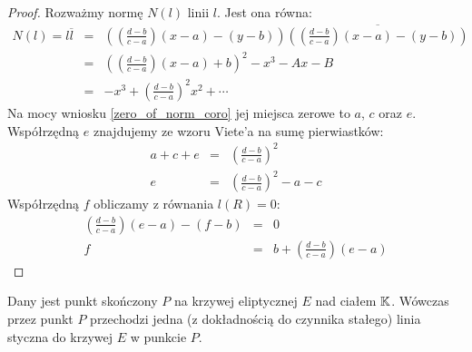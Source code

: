 \begin{proof}
Rozważmy normę $N(l)$ linii $l$. Jest ona równa:
\begin{eqnarray*}
N(l) = l\overline{l}
& = & \left(\left(\frac{d-b}{c-a}\right)(x - a) - (y - b)\right)
      \overline{\left(\left(\frac{d-b}{c-a}\right)(x - a) - (y - b)\right)} \\
& = & \left(\left(\frac{d-b}{c-a}\right)(x-a) + b\right)^2 - x^3 - Ax - B \\
& = & -x^3 + \left(\frac{d-b}{c-a}\right)^2x^2 + \cdots
\end{eqnarray*}
Na mocy wniosku \ref{zero_of_norm_coro}
jej miejsca zerowe to $a$, $c$ oraz $e$.
Współrzędną $e$ znajdujemy ze wzoru Viete'a na sumę pierwiastków:
\begin{eqnarray*}
a + c + e & = & \left(\frac{d-b}{c-a}\right)^2 \\
        e & = & \left(\frac{d-b}{c-a}\right)^2 - a - c
\end{eqnarray*}
Współrzędną $f$ obliczamy z równania $l(R) = 0$:
\begin{eqnarray*}
\left(\frac{d-b}{c-a}\right)(e - a) - (f - b) & = & 0 \\
f & = & b + \left(\frac{d-b}{c-a}\right)(e-a)
\end{eqnarray*}
\end{proof}

\begin{theorem}\label{line_tangent_at_point_theorem}
Dany jest punkt skończony $P$ na krzywej eliptycznej $E$ nad ciałem $\mathbb{K}$.
Wówczas przez punkt $P$ przechodzi jedna (z dokładnością do czynnika stałego)
linia styczna do krzywej $E$ w punkcie $P$.
\end{theorem}

